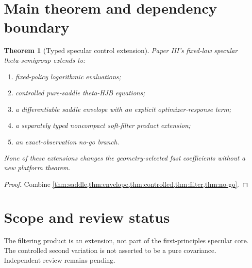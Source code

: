 \documentclass[11pt,reqno]{amsart}
\newtheorem{theorem}{Theorem}[section]
\theoremstyle{definition}
\theoremstyle{remark}
\begin{document}
\section{Main theorem and dependency boundary}\label{sec:main}
\begin{theorem}[Typed specular control extension]\label{thm:main}
Paper III's fixed-law specular theta-semigroup extends to:
\begin{enumerate}[label=(\roman*)]
\item fixed-policy logarithmic evaluations;
\item controlled pure-saddle theta-HJB equations;
\item a differentiable saddle envelope with an explicit optimizer-response
term;
\item a separately typed noncompact soft-filter product extension;
\item an exact-observation no-go branch.
\end{enumerate}
None of these extensions changes the geometry-selected fast coefficients
without a new platform theorem.
\end{theorem}
\begin{proof}
Combine \cref{thm:saddle,thm:envelope,thm:controlled,thm:filter,thm:no-go}.
\end{proof}

\section*{Scope and review status}
The filtering product is an extension, not part of the first-principles
specular core.  The controlled second variation is not asserted to be a pure
covariance.  Independent review remains pending.

\nocite{*}


\end{document}
